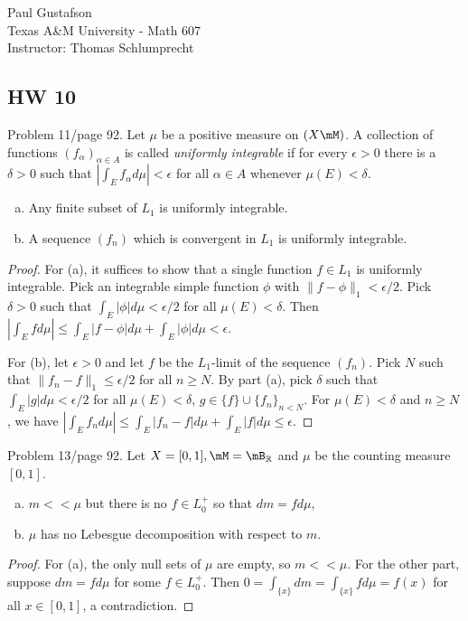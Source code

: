 \documentclass{article}
\begin{document}
\noindent Paul Gustafson\\
\noindent Texas A\&M University - Math 607\\ 
\noindent Instructor: Thomas Schlumprecht


\subsection*{HW 10}
  Problem 11/page 92. Let $\mu$ be a positive measure on $(X \mM)$. A collection of functions $(f_\alpha)_{\alpha \in A}$ is called \emph{uniformly integrable} if for every $\epsilon > 0$ there is a $\delta > 0$ such that $\left| \int_E f_\alpha d\mu \right| < \epsilon$ for all $\alpha \in A$ whenever $\mu(E) < \delta$.
\begin{enumerate}[a)]
\item Any finite subset of $L_1$ is uniformly integrable.
\item A sequence $(f_n)$ which is convergent in $L_1$ is uniformly integrable.
\end{enumerate}
\begin{proof}
For (a), it suffices to show that a single function $f \in L_1$ is uniformly integrable.  Pick an integrable simple function $\phi$ with
 $\|f - \phi\|_1 < \epsilon/2$.  Pick $\delta > 0$ such that $\int_E |\phi| d\mu < \epsilon/2$ for all $\mu(E) < \delta$.  
Then $\left| \int_E f d\mu \right| \le \int_E |f - \phi| d\mu + \int_E |\phi| d\mu < \epsilon$.

For (b), let $\epsilon > 0$ and let $f$ be the $L_1$-limit of the sequence $(f_n)$.  Pick $N$ such that $\| f_n - f \|_1 \le \epsilon/2$ for all $n \ge N$.  By part (a), pick $\delta$ such that $\int_E |g| d\mu  < \epsilon/2$ for all $\mu(E) < \delta$, $g \in \{f\} \cup \{f_n\}_{n < N}$.  
For $\mu(E) < \delta$ and $n \ge N$, we have 
$\left| \int_E f_n d\mu \right| \le \int_E |f_n -f| d\mu + \int_E |f| d\mu \le \epsilon$.
\end{proof}

 Problem 13/page 92.  Let $X = [0,1], \mM = \mB_\R$ and $\mu$ be the counting measure $[0,1]$.
\begin{enumerate}[a)]
\item $m << \mu$ but there is no $f \in L_0^+$ so that $dm = f d\mu$,
\item $\mu$ has no Lebesgue decomposition with respect to $m$.
\end{enumerate}
\begin{proof}
For (a), the only null sets of $\mu$ are empty, so $m << \mu$.  For the other part, suppose $dm = f d\mu$ for some $f \in L_0^+$.  Then $0 = \int_{\{x\}} dm = \int_{\{x\}} f d\mu = f(x)$ for all $x \in [0,1]$, a contradiction.



\end{proof}
\end{document}
